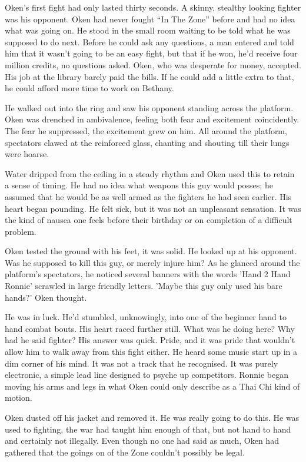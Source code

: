Oken's first fight had only lasted thirty seconds.  A skinny, stealthy looking fighter was his opponent.  Oken had never fought ``In The Zone'' before and had no idea what was going on.  He stood in the small room waiting to be told what he was supposed to do next.  Before he could ask any questions, a man entered and told him that it wasn't going to be an easy fight, but that if he won, he'd receive four million credits, no questions asked.  Oken, who was desperate for money, accepted.  His job at the library barely paid the bills.  If he could add a little extra to that, he could afford more time to work on Bethany.

He walked out into the ring and saw his opponent standing across the platform.  Oken was drenched in ambivalence, feeling both fear and excitement coincidently.  The fear he suppressed, the excitement grew on him.  All around the platform, spectators clawed at the reinforced glass, chanting and shouting till their lungs were hoarse.  

Water dripped from the ceiling in a steady rhythm and Oken used this to retain a sense of timing.  He had no idea what weapons this guy would posses; he assumed that he would be as well armed as the fighters he had seen earlier.  His heart began pounding.  He felt sick, but it was not an unpleasant sensation.  It was the kind of nausea one feels before their birthday or on completion of a difficult problem.

 Oken tested the ground with his feet, it was solid.  He looked up at his opponent.  Was he supposed to kill this guy, or merely injure him?  As he glanced around the platform's spectators, he noticed several banners with the words 'Hand 2 Hand Ronnie' scrawled in large friendly letters.  'Maybe this guy only used his bare hands?' Oken thought.  

He was in luck.  He'd stumbled, unknowingly, into one of the beginner hand to hand combat bouts.  His heart raced further still.  What was he doing here?  Why had he said fighter?  His answer was quick.  Pride, and it was pride that wouldn't allow him to walk away from this fight either.  He heard some music start up in a dim corner of his mind.  It was not a track that he recognised.  It was purely electronic, a simple lead line designed to psyche up competitors.  Ronnie began moving his arms and legs in what Oken could only describe as a Thai Chi kind of motion.  

Oken dusted off his jacket and removed it.  He was really going to do this.  He was used to fighting, the war had taught him enough of that, but not hand to hand and certainly not illegally.  Even though no one had said as much, Oken had gathered that the goings on of the Zone couldn't possibly be legal.

